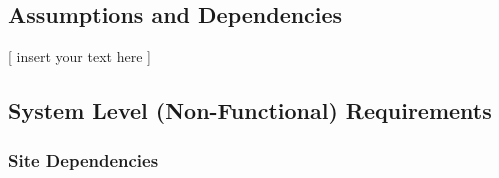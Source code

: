 \documentclass[twoside,letterpaper]{article}
\begin{document}
\subsection{Assumptions and Dependencies}

[ insert your text here ]

\subsection{System Level (Non-Functional) Requirements}

\subsubsection{Site Dependencies}
\end{document}
